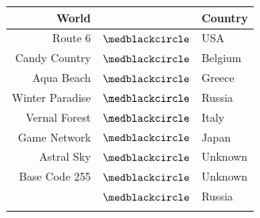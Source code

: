 \documentclass[12pt]{article}
\begin{document}
\begin{center}
\begin{tabular}{rcl}
\textbf{World} & & \textbf{Country} \\ \hline
Route 6 & \textcolor[HTML]{FF0000}{$\medblackcircle$} & USA \\
Candy Country & \textcolor[HTML]{FFFF00}{$\medblackcircle$} & Belgium \\
Aqua Beach & \textcolor[HTML]{0000FF}{$\medblackcircle$} & Greece \\
Winter Paradise & \textcolor[HTML]{00FFFF}{$\medblackcircle$} & Russia \\
Vernal Forest & \textcolor[HTML]{00FF00}{$\medblackcircle$} & Italy \\
Game Network & \textcolor[HTML]{FF00FF}{$\medblackcircle$} & Japan \\
Astral Sky & \textcolor[HTML]{7B00FF}{$\medblackcircle$} & Unknown \\
Base Code 255 & \textcolor[HTML]{000000}{$\medblackcircle$} & Unknown \\

\end{tabular}
\end{center}
\end{document}
